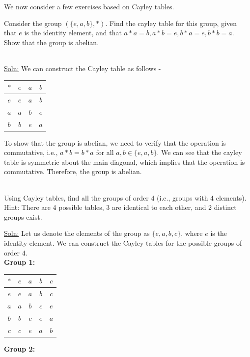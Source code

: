 \documentclass[openany]{book}
\begin{document}
We now consider a few exercises based on Cayley tables. \\
\begin{exercise}
    Consider the group $(\{e, a, b\}, *)$. Find the cayley table for this group, given that $e$ is the identity element, and that $a * a = b, a * b = e, b * a = e, b * b = a$. Show that the group is abelian.
\end{exercise} \\
\underline{Soln:} We can construct the Cayley table as follows -
\begin{center}
\begin{tabular}{c|c|c|c|}
    $*$ & $e$ & $a$ & $b$ \\
    \hline
    $e$ & $e$ & $a$ & $b$ \\
    $a$ & $a$ & $b$ & $e$ \\
    $b$ & $b$ & $e$ & $a$ \\
\end{tabular}
\end{center}
To show that the group is abelian, we need to verify that the operation is commutative, i.e., \( a * b = b * a \) for all \( a, b \in \{e, a, b\} \). We can see that the cayley table is symmetric about the main diagonal, which implies that the operation is commutative. Therefore, the group is abelian. \\ \\
\begin{exercise}
    Using Cayley tables, find all the groups of order 4 (i.e., groups with 4 elements). Hint: There are 4 possible tables, 3 are identical to each other, and 2 distinct groups exist.
\end{exercise}
\underline{Soln:} Let us denote the elements of the group as \( \{e, a, b, c\} \), where \( e \) is the identity element. We can construct the Cayley tables for the possible groups of order 4. \\
\textbf{Group 1:}
\begin{center}
\begin{tabular}{c|c|c|c|c|}
    $*$ & $e$ & $a$ & $b$ & $c$ \\
    \hline
    $e$ & $e$ & $a$ & $b$ & $c$ \\
    $a$ & $a$ & $b$ & $c$ & $e$ \\
    $b$ & $b$ & $c$ & $e$ & $a$ \\
    $c$ & $c$ & $e$ & $a$ & $b$ \\
\end{tabular}
\end{center}
\textbf{Group 2:}
\end{document}
